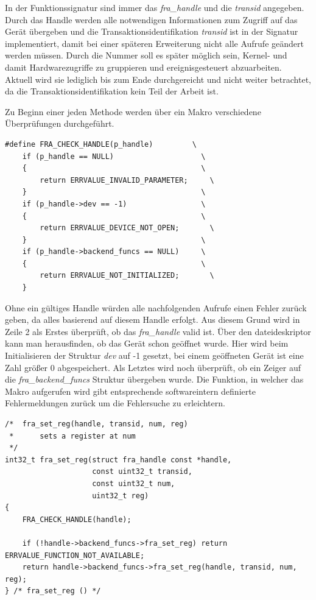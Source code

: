 In der Funktionssignatur sind immer das \textit{fra\_handle} und die \textit{transid} angegeben. Durch das Handle werden alle notwendigen Informationen zum Zugriff auf das Gerät übergeben und die Transaktionsidentifikation \textit{transid} ist in der Signatur implementiert, damit bei einer späteren Erweiterung nicht alle Aufrufe geändert werden müssen. Durch die Nummer soll es später möglich sein, Kernel- und damit Hardwarezugriffe zu gruppieren und ereignisgesteuert abzuarbeiten. Aktuell wird sie lediglich bis zum Ende durchgereicht und nicht weiter betrachtet, da die Transaktionsidentifikation kein Teil der Arbeit ist. 


Zu Beginn einer jeden Methode werden über ein Makro verschiedene Überprüfungen durchgeführt. 

\begin{lstfloat}
\begin{lstlisting}
#define FRA_CHECK_HANDLE(p_handle)         \
	if (p_handle == NULL)                    \
	{                                        \
		return ERRVALUE_INVALID_PARAMETER;     \
	}                                        \
	if (p_handle->dev == -1)                 \
	{                                        \
		return ERRVALUE_DEVICE_NOT_OPEN;       \
	}                                        \
	if (p_handle->backend_funcs == NULL)     \
	{                                        \
		return ERRVALUE_NOT_INITIALIZED;       \
	}  
\end{lstlisting}
\end{lstfloat}

Ohne ein gültiges Handle würden alle nachfolgenden Aufrufe einen Fehler zurück geben, da alles basierend auf diesem Handle erfolgt. Aus diesem Grund wird in Zeile 2 als Erstes überprüft, ob das \textit{fra\_handle} valid ist. Über den \gls{dateideskriptor} kann man herausfinden, ob das Gerät schon geöffnet wurde. Hier wird beim Initialisieren der Struktur \textit{dev} auf -1 gesetzt, bei einem geöffneten Gerät ist eine Zahl größer 0 abgespeichert. Als Letztes wird noch überprüft, ob ein Zeiger auf die \textit{fra\_backend\_funcs} Struktur übergeben wurde. Die Funktion, in welcher das Makro aufgerufen wird gibt entsprechende softwareintern definierte Fehlermeldungen zurück um die Fehlersuche zu erleichtern.\\


\begin{lstfloat}
\begin{lstlisting}
/*  fra_set_reg(handle, transid, num, reg)
 *      sets a register at num
 */
int32_t fra_set_reg(struct fra_handle const *handle,
					const uint32_t transid,
					const uint32_t num, 
					uint32_t reg)
{
	FRA_CHECK_HANDLE(handle);

	if (!handle->backend_funcs->fra_set_reg) return ERRVALUE_FUNCTION_NOT_AVAILABLE;
	return handle->backend_funcs->fra_set_reg(handle, transid, num, reg);
} /* fra_set_reg () */
\end{lstlisting}
\end{lstfloat}

